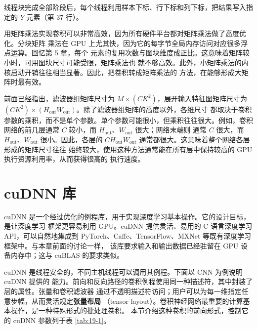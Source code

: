 线程块完成全部阶段后，每个线程利用样本下标、行下标和列下标，把结果写入指定的 $Y$
元素（第 37 行）。

用矩阵乘法实现卷积可以非常高效，因为所有硬件平台都对矩阵乘法做了高度优化。分块矩阵
乘法在 GPU 上尤其快，因为它的每字节全局内存访问对应很多浮点运算。回忆第 5 章，每个
元素的复用次数与图块维度成正比。这意味着矩阵较小时，可用图块尺寸可能受限，矩阵乘法也
就不够高效。此外，小矩阵乘法的内核启动开销往往相当显著。因此，把卷积转成矩阵乘法的
方法，在能够形成大矩阵时最有效。

前面已经指出，滤波器组矩阵尺寸为 $M\times(CK^2)$，展开输入特征图矩阵尺寸为
$(CK^2)\times(H_{\mathrm{out}}W_{\mathrm{out}})$。除了滤波器组矩阵的高度以外，各维尺寸
都取决于卷积参数的乘积，而不是单个参数。单个参数可能很小，但乘积往往很大。例如，卷积
网络的前几层通常 $C$ 较小，而 $H_{\mathrm{out}}$、$W_{\mathrm{out}}$ 很大；网络末端则
通常 $C$ 很大，而 $H_{\mathrm{out}}$、$W_{\mathrm{out}}$ 很小。因此，各层的
$C H_{\mathrm{out}}W_{\mathrm{out}}$ 通常都很大。这意味着整个网络各层形成的矩阵尺寸往往
始终较大，使用这种方法通常能在所有层中保持较高的 GPU 执行资源利用率，从而获得很高的
执行速度。

\section{cuDNN 库}
\label{sec:cudnn-library}

cuDNN 是一个经过优化的例程库，用于实现深度学习基本操作。它的设计目标，是让深度学习
框架更容易利用 GPU。cuDNN 提供灵活、易用的 C 语言深度学习 API，可以自然地集成到
PyTorch、Caffe、TensorFlow、MXNet 等既有深度学习框架中。与本章前面的讨论一样，
该库要求输入和输出数据已经驻留在 GPU 设备内存中；这与 cuBLAS 的要求类似。

cuDNN 是线程安全的，不同主机线程可以调用其例程。下面以 CNN 为例说明 cuDNN 提供的
能力。前向和反向路径的卷积例程使用同一种描述符，其中封装了层的属性。张量和卷积滤波器
通过不透明描述符访问；用户可以为每一维指定任意步幅，从而灵活规定\textbf{张量布局}
（tensor layout）。卷积神经网络最重要的计算基本操作，是一种特殊形式的批处理卷积。
本节介绍这种卷积的前向形式，控制它的 cuDNN 参数列于表 \ref{tab:19-1}。

